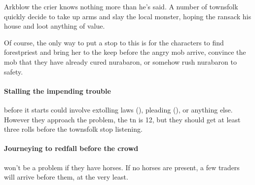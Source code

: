Arkblow the crier knows nothing more than he's said.  A number of townsfolk quickly decide to take up arms and slay the local monster, hoping the ransack his house and loot anything of value.

Of course, the only way to put a stop to this is for the characters to find \gls{forestpriest} and bring her to the keep before the angry mob arrive, convince the mob that they have already cured \gls{nurabaron}, or somehow rush \gls{nurabaron} to safety.

\paragraph{Stalling the impending trouble}
before it starts could involve extolling laws (), pleading (), or anything else.
However they approach the problem, the \gls{tn} is 12, but they should get at least three rolls before the townsfolk stop listening.

\paragraph{Journeying to \gls{redfall} before the crowd}
won't be a problem if they have horses.
If no horses are present, a few traders will arrive before them, at the very least.

%
%
%
%

